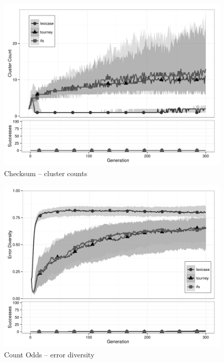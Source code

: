 \begin{figure}[p] %
\centering
\includegraphics[width=11.5cm]{checksum-cluster.pdf}
\caption{Checksum -- cluster counts}
\label{checksumClu}
\end{figure}

\begin{figure}[p] %
\centering
\includegraphics[width=11.5cm]{count-odds-diversity.pdf}
\caption{Count Odds -- error diversity}
\label{count-oddsDiv}
\end{figure}


